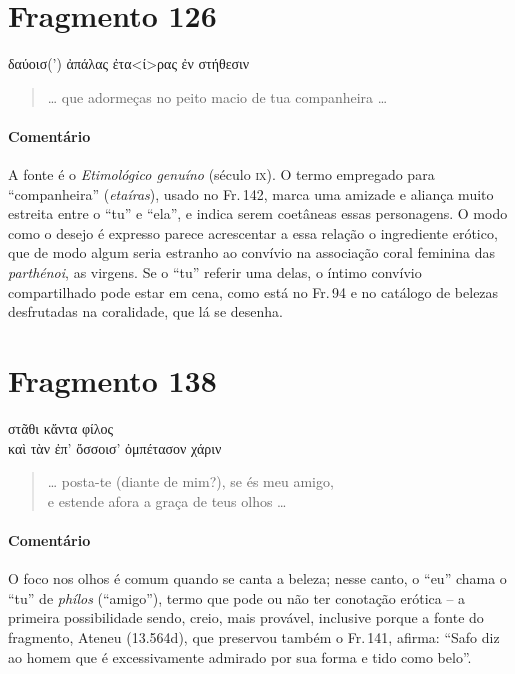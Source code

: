\section{Fragmento 126}

\begin{gkverse}
δαύοισ(’) ἀπάλας ἐτα<ί>ρας ἐν στήθεσιν
\end{gkverse}

\begin{verse}
\ldots{} que adormeças no peito macio de tua companheira \ldots{} 
\end{verse}

{\paragraph{Comentário} A fonte é o \textit{Etimológico genuíno }(século \textsc{ix}). O termo empregado para
“companheira” (\textit{etaíras}), usado no Fr.\,142, marca uma amizade e aliança muito estreita entre o “tu”
e “ela”, e indica serem coetâneas essas personagens. O modo como o desejo é expresso parece acrescentar a essa relação o
ingrediente erótico, que de modo algum seria estranho ao convívio na associação coral feminina das \textit{parthénoi}, as virgens. Se o ``tu'' referir uma delas, o íntimo convívio compartilhado pode estar em cena, como está no Fr.\,94 e no catálogo de belezas desfrutadas na coralidade, que lá se desenha.}




\pagebreak
\section{Fragmento 138}

\begin{gkverse}
στᾶθι \dagger{}κἄντα\dagger{} φίλος\\
καὶ τὰν ἐπ’ ὄσσοισ’ ὀμπέτασον χάριν
\end{gkverse}

\begin{verse}
\ldots{} posta-te (diante de mim?), se és meu amigo,\\
e estende afora a graça de teus olhos \ldots{}
\end{verse}

{\paragraph{Comentário} O foco nos olhos é comum quando se canta a beleza; nesse canto, o “eu” chama o
“tu” de \textit{phílos }(``amigo”), termo que pode ou não ter conotação
erótica -- a primeira possibilidade sendo, creio, mais provável, inclusive
porque a fonte do fragmento, Ateneu (13.564d), que preservou também o Fr.\,141, afirma:
``Safo diz ao homem que é excessivamente admirado por sua forma e tido como belo''.}



